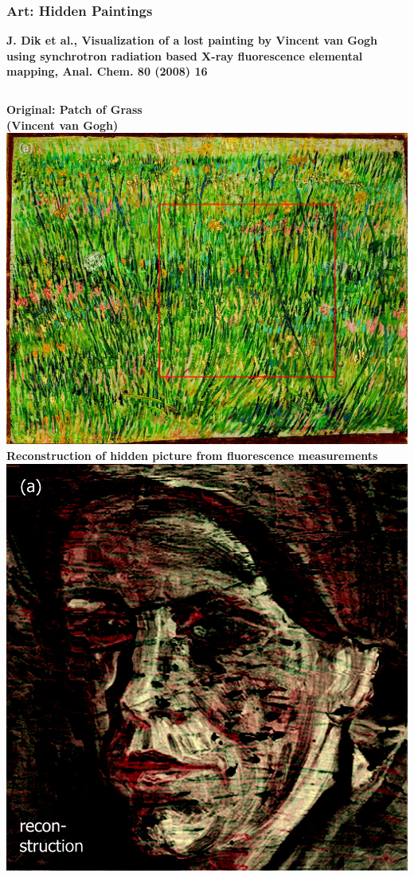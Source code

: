 \documentclass[10pt,t]{beamer}
\begin{document}
\begin{frame}
\frametitle{Art: Hidden Paintings}
\vspace*{-2.6\baselineskip}
\alert{\bfseries\footnotesize J. Dik et al., Visualization of a lost painting by Vincent van Gogh using synchrotron radiation based X-ray fluorescence elemental mapping, Anal. Chem. 80 (2008) 16}
\vspace*{0.5\baselineskip}
\begin{columns}
\textbf{Original: \glqq Patch of Grass\grqq\\(Vincent van Gogh)} \\[1ex]
    \includegraphics[width=\textwidth]{vangogh-original}
\textbf{Reconstruction of hidden picture from fluorescence measurements} \\[1ex]
    \includegraphics[width=\textwidth]{vangogh-rekonstruktion}
\end{columns}
\vspace*{-8pt}
\end{frame}
\end{document}
